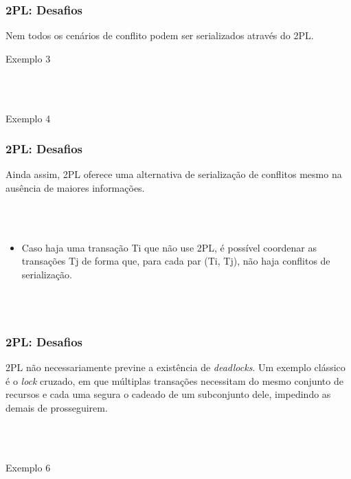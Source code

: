 \documentclass{beamer}
\begin{document}

\begin{frame}
\frametitle{2PL: Desafios}
    Nem todos os cenários de conflito podem ser serializados através do 2PL. 

    \begin{example}{Exemplo 3}
    \end{example}

    \\~\\
    \begin{example}{Exemplo 4}
    \end{example}

\end{frame}


\begin{frame}
    \frametitle{2PL: Desafios}

    Ainda assim, 2PL oferece uma alternativa de serialização de conflitos mesmo na ausência de maiores informações. 

    \\~\\
    \begin{itemize}
        \item Caso haja uma transação Ti que não use 2PL, é possível coordenar as transações Tj de forma que, para cada par (Ti, Tj), não haja conflitos de serialização.
    \end{itemize}

    \\~\\
\end{frame}


\begin{frame}
    \frametitle{2PL: Desafios}

    2PL não necessariamente previne a existência de \emph{deadlocks}. Um exemplo clássico é o \emph{lock} cruzado, em que múltiplas transações necessitam do mesmo conjunto de recursos e cada uma segura o cadeado de um subconjunto dele, impedindo as demais de prosseguirem.

    \\~\\
    \begin{example}{Exemplo 6}
    \end{example}
\end{frame}
\end{document}
